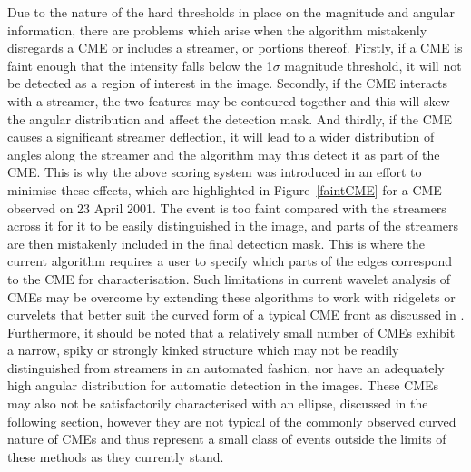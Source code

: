 \documentclass[namedreferences]{SolarPhysics}
\begin{document}
\begin{article}
Due to the nature of the hard thresholds in place on the magnitude and angular information, there are problems which arise when the algorithm mistakenly disregards a CME or includes a streamer, or portions thereof. Firstly, if a CME is faint enough that the intensity falls below the 1$\sigma$ magnitude threshold, it will not be detected as a region of interest in the image. Secondly, if the CME interacts with a streamer, the two features may be contoured together and this will skew the angular distribution and affect the detection mask. And thirdly, if the CME causes a significant streamer deflection, it will lead to a wider distribution of angles along the streamer and the algorithm may thus detect it as part of the CME. This is why the above scoring system was introduced in an effort to minimise these effects, which are highlighted in Figure~\ref{faintCME} for a CME observed on 23 April 2001. The event is too faint compared with the streamers across it for it to be easily distinguished in the image, and parts of the streamers are then mistakenly included in the final detection mask. This is where the current algorithm requires a user to specify which parts of the edges correspond to the CME for characterisation. Such limitations in current wavelet analysis of CMEs may be overcome by extending these algorithms to work with ridgelets or curvelets that better suit the curved form of a typical CME front as discussed in \citet{2010gallagher}. Furthermore, it should be noted that a relatively small number of CMEs exhibit a narrow, spiky or strongly kinked structure which may not be readily distinguished from streamers in an automated fashion, nor have an adequately high angular distribution for automatic detection in the images. These CMEs may also not be satisfactorily characterised with an ellipse, discussed in the following section, however they are not typical of the commonly observed curved nature of CMEs and thus represent a small class of events outside the limits of these methods as they currently stand.



%



%
  


\end{article}
\end{document}

